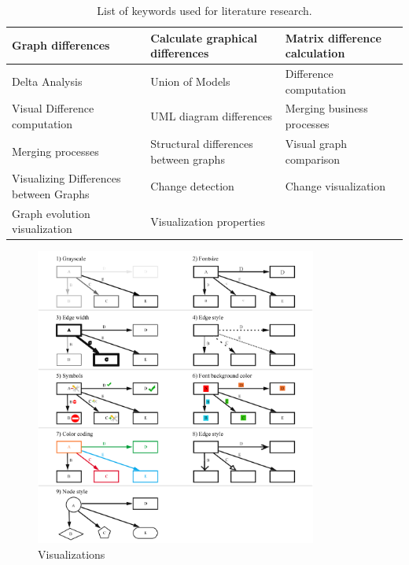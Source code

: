 \documentclass{llncs}
\begin{document}
\begin{keywords}
\begin{table}
	\centering
		\begin{tabular}{|p{4cm}|p{4cm}|p{4cm}|}
			\hline
			Graph differences & Calculate graphical differences & Matrix difference calculation 	\\
			\hline
			Delta Analysis & Union of Models &  Difference computation 	\\
			\hline
			Visual Difference computation & UML diagram differences &  Merging business processes 	\\
			\hline
			Merging processes  & Structural differences between graphs & Visual graph comparison 	\\
			\hline
			Visualizing Differences between Graphs & Change detection & Change visualization 	\\
			\hline
			Graph evolution visualization & Visualization properties &  	\\
			\hline
		\end{tabular}
		\vspace{10pt}
\caption{List of keywords used for literature research.}
\label{table:Keywords}
\end{table}

\begin{figure}
	\centering
	\includegraphics[width=350px]{Images/Overview.PNG}
	\caption{Visualizations}
	\label{fig:visualizations}
\end{figure}



\end{keywords}
\end{document}
